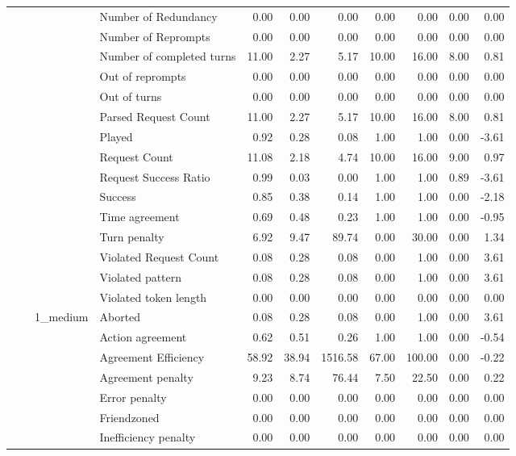 \begin{tabular}{llllrrrrrrr}
 &  &  & Number of Redundancy & 0.00 & 0.00 & 0.00 & 0.00 & 0.00 & 0.00 & 0.00 \\
 &  &  & Number of Reprompts & 0.00 & 0.00 & 0.00 & 0.00 & 0.00 & 0.00 & 0.00 \\
 &  &  & Number of completed turns & 11.00 & 2.27 & 5.17 & 10.00 & 16.00 & 8.00 & 0.81 \\
 &  &  & Out of reprompts & 0.00 & 0.00 & 0.00 & 0.00 & 0.00 & 0.00 & 0.00 \\
 &  &  & Out of turns & 0.00 & 0.00 & 0.00 & 0.00 & 0.00 & 0.00 & 0.00 \\
 &  &  & Parsed Request Count & 11.00 & 2.27 & 5.17 & 10.00 & 16.00 & 8.00 & 0.81 \\
 &  &  & Played & 0.92 & 0.28 & 0.08 & 1.00 & 1.00 & 0.00 & -3.61 \\
 &  &  & Request Count & 11.08 & 2.18 & 4.74 & 10.00 & 16.00 & 9.00 & 0.97 \\
 &  &  & Request Success Ratio & 0.99 & 0.03 & 0.00 & 1.00 & 1.00 & 0.89 & -3.61 \\
 &  &  & Success & 0.85 & 0.38 & 0.14 & 1.00 & 1.00 & 0.00 & -2.18 \\
 &  &  & Time agreement & 0.69 & 0.48 & 0.23 & 1.00 & 1.00 & 0.00 & -0.95 \\
 &  &  & Turn penalty & 6.92 & 9.47 & 89.74 & 0.00 & 30.00 & 0.00 & 1.34 \\
 &  &  & Violated Request Count & 0.08 & 0.28 & 0.08 & 0.00 & 1.00 & 0.00 & 3.61 \\
 &  &  & Violated pattern & 0.08 & 0.28 & 0.08 & 0.00 & 1.00 & 0.00 & 3.61 \\
 &  &  & Violated token length & 0.00 & 0.00 & 0.00 & 0.00 & 0.00 & 0.00 & 0.00 \\
\cline{3-11}
 &  & \multirow[t]{27}{*}{1_medium} & Aborted & 0.08 & 0.28 & 0.08 & 0.00 & 1.00 & 0.00 & 3.61 \\
 &  &  & Action agreement & 0.62 & 0.51 & 0.26 & 1.00 & 1.00 & 0.00 & -0.54 \\
 &  &  & Agreement Efficiency & 58.92 & 38.94 & 1516.58 & 67.00 & 100.00 & 0.00 & -0.22 \\
 &  &  & Agreement penalty & 9.23 & 8.74 & 76.44 & 7.50 & 22.50 & 0.00 & 0.22 \\
 &  &  & Error penalty & 0.00 & 0.00 & 0.00 & 0.00 & 0.00 & 0.00 & 0.00 \\
 &  &  & Friendzoned & 0.00 & 0.00 & 0.00 & 0.00 & 0.00 & 0.00 & 0.00 \\
 &  &  & Inefficiency penalty & 0.00 & 0.00 & 0.00 & 0.00 & 0.00 & 0.00 & 0.00 \\

\end{tabular}
